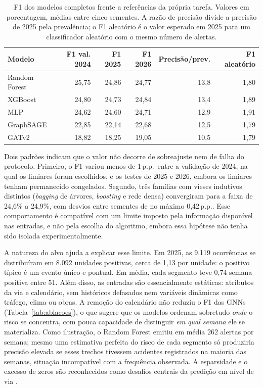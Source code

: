 \documentclass[12pt]{article}
\newcommand{\pp}{\,p.p.}
\begin{document}
\begin{table}[htbp]
\centering
\caption{F1 dos modelos completos frente a referências da própria
tarefa. Valores em porcentagem, médias entre cinco sementes. A razão de
precisão divide a precisão de 2025 pela prevalência; o F1 aleatório é o
valor esperado em 2025 para um classificador aleatório com o mesmo
número de alertas.}
\label{tab:f1-referencias}
\footnotesize
\setlength{\tabcolsep}{4pt}
\begin{tabular}{lrrrrr}
\toprule
\textbf{Modelo} & \textbf{F1 val. 2024} & \textbf{F1 2025} &
\textbf{F1 2026} & \textbf{Precisão/prev.} & \textbf{F1 aleatório} \\
\midrule
Random Forest & 25,75 & 24,86 & 24,77 & 13,8 & 1,80 \\
XGBoost       & 24,80 & 24,73 & 24,84 & 13,4 & 1,89 \\
MLP           & 24,62 & 24,60 & 24,71 & 12,9 & 1,91 \\
GraphSAGE     & 22,85 & 22,14 & 22,68 & 12,5 & 1,79 \\
GATv2         & 18,82 & 18,25 & 19,05 & 10,5 & 1,79 \\
\bottomrule
\end{tabular}
\end{table}

Dois padrões indicam que o valor não decorre de sobreajuste nem de falha
do protocolo. Primeiro, o F1 variou menos de 1\pp\ entre a
validação de 2024, na qual os limiares foram escolhidos, e os testes de
2025 e 2026, embora os limiares tenham permanecido congelados. Segundo,
três famílias com vieses indutivos distintos (\textit{bagging} de
árvores, \textit{boosting} e rede densa) convergiram para a faixa de
24,6\% a 24,9\%, com desvios entre sementes de no máximo 0,42\pp. Esse
comportamento é compatível com um limite imposto pela informação
disponível nas entradas, e não pela escolha do algoritmo, embora essa
hipótese não tenha sido isolada experimentalmente.

A natureza do alvo ajuda a explicar esse limite. Em 2025, as 9.119
ocorrências se distribuíram em 8.092 unidades positivas, cerca de 1,13
por unidade: o positivo típico é um evento único e pontual. Em média,
cada segmento teve 0,74 semana positiva entre 51. Além disso, as
entradas são essencialmente estáticas: atributos da via e calendário,
sem históricos defasados nem variáveis dinâmicas como tráfego, clima ou
obras. A remoção do calendário não reduziu o F1 das GNNs
(Tabela~\ref{tab:ablacoes}), o que sugere que os modelos ordenam
sobretudo \emph{onde} o risco se concentra, com pouca capacidade de
distinguir \emph{em qual semana} ele se materializa. Como ilustração,
o Random Forest emitiu em média 262 alertas por semana; mesmo uma
estimativa perfeita do risco de cada segmento só produziria precisão
elevada se esses trechos tivessem acidentes registrados na maioria das
semanas, situação incompatível com a frequência observada. A
esparsidade e o excesso de zeros são reconhecidos como desafios centrais
da predição em nível de via \cite{zhuang2024}.
\end{document}
